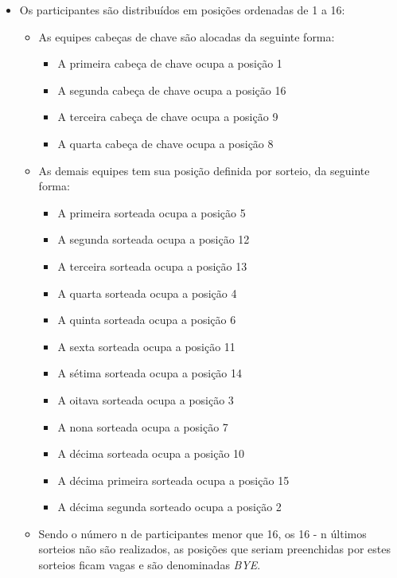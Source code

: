 \begin{itemize}[noitemsep]
	\item Os participantes são distribuídos em posições ordenadas de 1 a 16:
	\begin{itemize}[noitemsep]
		\item As equipes cabeças de chave são alocadas da seguinte forma:
		\begin{itemize}[noitemsep]
			\item A primeira cabeça de chave ocupa a posição 1
			\item A segunda cabeça de chave ocupa a posição 16
			\item A terceira cabeça de chave ocupa a posição 9
			\item A quarta cabeça de chave ocupa a posição 8
		\end{itemize}

		\item As demais equipes tem sua posição definida por sorteio, da seguinte forma:
		\begin{itemize}[noitemsep]
			\item A primeira sorteada ocupa a posição 5
			\item A segunda sorteada ocupa a posição 12
			\item A terceira sorteada ocupa a posição 13
			\item A quarta sorteada ocupa a posição 4
			\item A quinta sorteada ocupa a posição 6
			\item A sexta sorteada ocupa a posição 11
			\item A sétima sorteada ocupa a posição 14
			\item A oitava sorteada ocupa a posição 3
			\item A nona sorteada ocupa a posição 7
			\item A décima sorteada ocupa a posição 10
			\item A décima primeira sorteada ocupa a posição 15
			\item A décima segunda sorteado ocupa a posição 2
		\end{itemize}

		\item Sendo o número n de participantes menor que 16, os 16 - n últimos sorteios não são realizados, as posições que seriam preenchidas por estes sorteios ficam vagas e são denominadas \textit{BYE}.
	\end{itemize}


\end{itemize}
